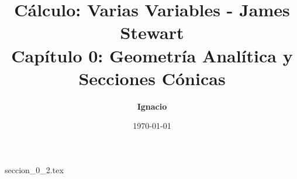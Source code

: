 \documentclass[11pt,spanish,oneside]{report}
\title{\textbf{Cálculo: Varias Variables - James Stewart} \\ \Large Capítulo 0: Geometría Analítica y Secciones Cónicas}
\author{\textbf{Ignacio}}
\date{\today}
\begin{document}
\maketitle

{seccion_0_2.tex}
\end{document}
